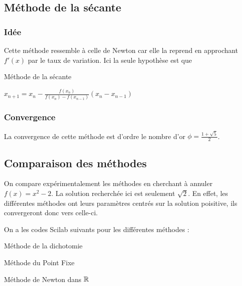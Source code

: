 	\subsection{Méthode de la sécante}

		\subsubsection{Idée}

			Cette méthode ressemble à celle de Newton car elle la reprend en approchant $f'(x)$ par le taux de variation. Ici la seule hypothèse est que

			\begin{algorithm}[H]
			\caption{Méthode de la sécante}
				{
					$x_{n+1} = x_n - \frac{f(x_n)}{f(x_n) - f(x_{n-1})}(x_n - x_{n-1})$\;
				}
			\end{algorithm}


		\subsubsection{Convergence}
			La convergence de cette méthode est d'ordre le nombre d'or $\phi =\frac{1+\sqrt{5}}{2}$.


	\subsection{Comparaison des méthodes}

		On compare expérimentalement les méthodes en cherchant à annuler $f(x) = x^2 - 2$. La solution recherchée ici est seulement $\sqrt{2}$. En effet, les différentes méthodes ont leurs paramètres centrés sur la solution poisitive, ils convergeront donc vers celle-ci.

		On a les codes Scilab suivants pour les différentes méthodes :

		\begin{listing}[H]
		\label{code-1-dichotomie}
			\caption{Méthode de la dichotomie}
		\end{listing}

		\begin{listing}[H]
		\label{code-1-pointFixe}
			\caption{Méthode du Point Fixe}
		\end{listing}

		\begin{listing}[H]
		\label{code-1-newton}
			\caption{Méthode de Newton dans $\R$}
		\end{listing}

